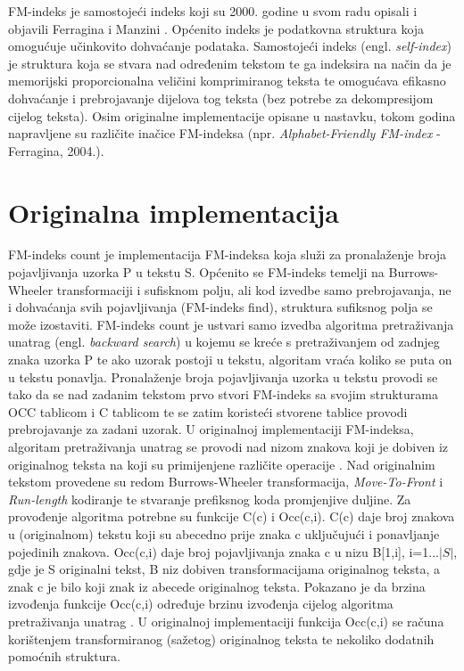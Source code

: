 FM-indeks je samostojeći indeks koji su 2000. godine u svom radu opisali i objavili Ferragina i Manzini \cite{fm1}. Općenito indeks je podatkovna struktura koja omogućuje učinkovito dohvaćanje podataka. Samostojeći indeks (engl. \emph{self-index}) je struktura koja se stvara nad određenim tekstom te ga indeksira na način da je memorijski proporcionalna veličini komprimiranog teksta te omogućava efikasno dohvaćanje i prebrojavanje dijelova tog teksta (bez potrebe za dekompresijom cijelog teksta).
Osim originalne implementacije opisane u nastavku, tokom godina napravljene su različite inačice FM-indeksa (npr. \emph{Alphabet-Friendly FM-index} - Ferragina, 2004.).

\section{Originalna implementacija}
FM-indeks count je implementacija FM-indeksa koja služi za pronalaženje broja pojavljivanja uzorka P u tekstu S. Općenito se FM-indeks temelji na Burrows-Wheeler transformaciji i sufisknom polju, ali kod izvedbe samo prebrojavanja, ne i dohvaćanja svih pojavljivanja (FM-indeks find), struktura sufiksnog polja se može izostaviti.
FM-indeks count je ustvari samo izvedba algoritma pretraživanja unatrag  (engl. \emph{backward search}) u kojemu se kreće s pretraživanjem od zadnjeg znaka uzorka P te ako uzorak postoji u tekstu, algoritam vraća koliko se puta on u tekstu ponavlja.
Pronalaženje broja pojavljivanja uzorka u tekstu provodi se tako da se nad zadanim tekstom prvo stvori FM-indeks sa svojim strukturama OCC tablicom i C tablicom te se zatim koristeći stvorene tablice provodi prebrojavanje za zadani uzorak.
U originalnoj implementaciji FM-indeksa, algoritam pretraživanja unatrag se provodi nad nizom znakova koji je dobiven iz originalnog teksta na koji su primijenjene različite operacije \cite{fm1}. Nad originalnim tekstom provedene su redom Burrows-Wheeler transformacija, \emph{Move-To-Front} i \emph{Run-length} kodiranje te stvaranje prefiksnog koda promjenjive duljine.  Za provođenje algoritma potrebne su funkcije C(c) i Occ(c,i). C(c) daje broj znakova u (originalnom) tekstu koji su abecedno prije znaka c uključujući i ponavljanje pojedinih znakova. Occ(c,i) daje broj pojavljivanja znaka c u nizu B[1,i], i=1...$|S|$, gdje je S originalni tekst, B niz dobiven transformacijama originalnog teksta, a znak c je bilo koji znak iz abecede originalnog teksta. Pokazano je da brzina izvođenja funkcije Occ(c,i) određuje brzinu izvođenja cijelog algoritma pretraživanja unatrag \cite{fm2}. U originalnoj implementaciji funkcija Occ(c,i) se računa korištenjem transformiranog (sažetog) originalnog teksta te nekoliko dodatnih pomoćnih struktura. 



